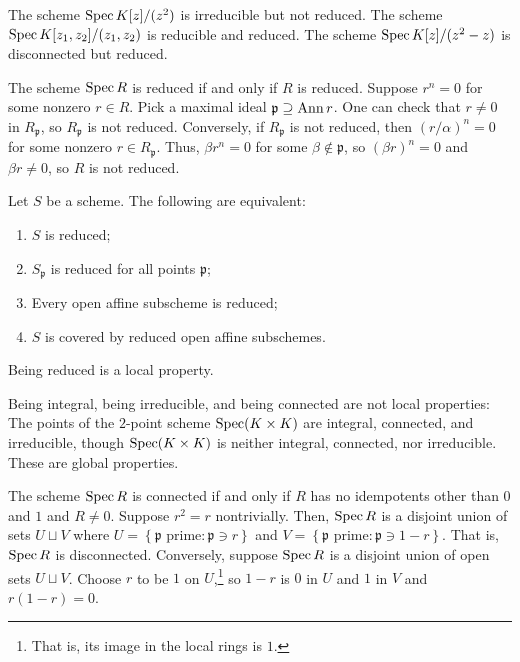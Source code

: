 \documentclass [11 pt, oneside] {article}
\begin{document}
\begin{example}[ ]\label{}\text{}
The scheme $\operatorname{Spec} K[z]/(z^2)$ is irreducible but not reduced. The scheme $\operatorname{Spec} K[z_1,z_2]/(z_1,z_2)$ is reducible and reduced. The scheme $\operatorname{Spec} K[z]/(z^2-z)$ is disconnected but reduced.
\end{example}

The scheme $\operatorname{Spec} R$ is reduced if and only if $R$ is reduced. Suppose $r^n =0$ for some nonzero $r\in R$. Pick a maximal ideal $\mathfrak{p}\supseteq \operatorname{Ann} r$. One can check that $r\ne 0$ in $R_{\mathfrak{p}}$, so $R_{\mathfrak{p}}$ is not reduced. Conversely, if $R_{\mathfrak{p}}$ is not reduced, then $(r/\alpha)^n=0$ for some nonzero $r\in R_{\mathfrak{p}}$. Thus, $\beta r^n =0$ for some $\beta\notin \mathfrak{p}$, so $(\beta r)^n=0$ and $\beta r\ne 0$, so $R$ is not reduced. 

\begin{proposition}[ ]\label{}\text{}
Let $S$ be a scheme. The following are equivalent:
\begin{enumerate}
	\item $S$ is reduced;
	\item $S_{\mathfrak{p}}$ is reduced for all points $\mathfrak{p}$;
	\item Every open affine subscheme is reduced;
	\item $S$ is covered by reduced open affine subschemes.
\end{enumerate}
\end{proposition}

\begin{remark}
	Being reduced is a local property.
\end{remark}

\begin{remark}
	Being integral, being irreducible, and being connected are not local properties: The points of the $2$-point scheme $\operatorname{Spec} (K\times K)$ are integral, connected, and irreducible, though $\operatorname{Spec}(K\times K)$ is neither integral, connected, nor irreducible. These are global properties.
\end{remark}

The scheme $\operatorname{Spec} R$ is connected if and only if $R$ has no idempotents other than $0$ and $1$ and $R\ne 0$. Suppose $r^2 = r$ nontrivially. Then, $\operatorname{Spec} R$ is a disjoint union of sets $U\sqcup V$ where $U = \left\{ \textrm{$\mathfrak{p}$ prime}: \mathfrak{p}\ni r \right\} $ and $V = \left\{\textrm{$\mathfrak{p}$ prime}: \mathfrak{p} \ni 1-r \right\}$. That is, $\operatorname{Spec} R$ is disconnected. Conversely, suppose $\operatorname{Spec} R$ is a disjoint union of open sets $U\sqcup V$. Choose $r$ to be $1$ on $U$,\footnote{That is, its image in the local rings is $1$.} so $1-r$ is $0$ in $U$ and $1$ in $V$ and $r(1-r)=0$.
\end{document}
